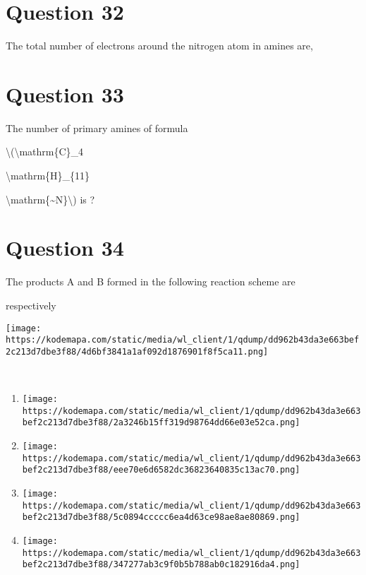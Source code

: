 \documentclass{article}
\begin{document}
\section*{Question 32}
The total number of electrons around the nitrogen atom in amines are,


\begin{enumerate}[label=(\alph*)]
\end{enumerate}
\newpage
\section*{Question 33}
The number of primary amines of formula

\textbackslash(\textbackslash mathrm\{C\}\_4

\textbackslash mathrm\{H\}\_\{11\}

\textbackslash mathrm\{\textasciitilde N\}\textbackslash) is ?


\begin{enumerate}[label=(\alph*)]
\end{enumerate}
\newpage
\section*{Question 34}
The products A and B formed in the following reaction scheme are

respectively



\texttt{[image: https://kodemapa.com/static/media/wl\_client/1/qdump/dd962b43da3e663bef2c213d7dbe3f88/4d6bf3841a1af092d1876901f8f5ca11.png]}\\



{}\strut \\


\begin{enumerate}[label=(\alph*)]
\item \texttt{[image: https://kodemapa.com/static/media/wl\_client/1/qdump/dd962b43da3e663bef2c213d7dbe3f88/2a3246b15ff319d98764dd66e03e52ca.png]}


\item \texttt{[image: https://kodemapa.com/static/media/wl\_client/1/qdump/dd962b43da3e663bef2c213d7dbe3f88/eee70e6d6582dc36823640835c13ac70.png]}


\item \texttt{[image: https://kodemapa.com/static/media/wl\_client/1/qdump/dd962b43da3e663bef2c213d7dbe3f88/5c0894ccccc6ea4d63ce98ae8ae80869.png]}


\item \texttt{[image: https://kodemapa.com/static/media/wl\_client/1/qdump/dd962b43da3e663bef2c213d7dbe3f88/347277ab3c9f0b5b788ab0c182916da4.png]}


\end{enumerate}
\newpage
\end{document}
